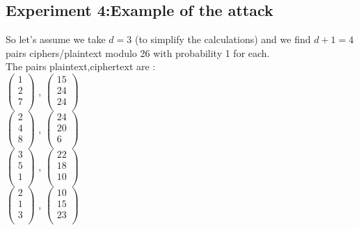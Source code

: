 \documentclass{article}
\begin{document}
\subsection*{Experiment 4:Example of the attack}
So let's assume we take $d = 3$ (to simplify the calculations) and we find $d+1 =4$ pairs ciphers/plaintext modulo 26 with probability 1 for each.\\
The pairs plaintext,ciphertext are :\\
 $\begin{pmatrix}
	1 \\
	2\\
	7\\
 \end{pmatrix} $
, $\begin{pmatrix}
	15\\
	24\\
	24\\
	\end{pmatrix}$\\
	$\begin{pmatrix}
	2 \\
	4\\
	8\\
 \end{pmatrix} $
, $\begin{pmatrix}
	24\\
	20\\
	6\\
	\end{pmatrix}$\\
	$\begin{pmatrix}
	3 \\
	5\\
	1\\
 \end{pmatrix} $
, $\begin{pmatrix}
	22\\
	18\\
	10\\
	\end{pmatrix}$\\
	$\begin{pmatrix}
	2\\
	1\\
	3\\
 \end{pmatrix} $
, $\begin{pmatrix}
	10\\
	15\\
	23\\
	\end{pmatrix}$\\
\end{document}
